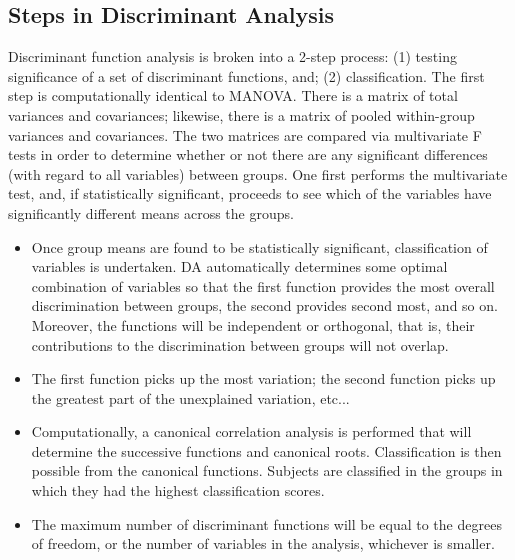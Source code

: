 \subsection{Steps in Discriminant Analysis}
Discriminant function analysis is broken into a 2-step process: (1) testing
significance of a set of discriminant functions, and; (2) classification. The first
step is computationally identical to MANOVA. There is a matrix of total variances
and covariances; likewise, there is a matrix of pooled within-group variances and
covariances. The two matrices are compared via multivariate F tests in order to
determine whether or not there are any significant differences (with regard to all
variables) between groups. One first performs the multivariate test, and, if
statistically significant, proceeds to see which of the variables have significantly
different means across the groups.

\begin{itemize}
\item Once group means are found to be statistically significant, classification of
variables is undertaken. DA automatically determines some optimal combination
of variables so that the first function provides the most overall discrimination
between groups, the second provides second most, and so on. Moreover, the
functions will be independent or orthogonal, that is, their contributions to the
discrimination between groups will not overlap. 
\item The first function picks up the
most variation; the second function picks up the greatest part of the unexplained
variation, etc... 
\item Computationally, a canonical correlation analysis is performed
that will determine the successive functions and canonical roots. Classification is
then possible from the canonical functions. Subjects are classified in the groups
in which they had the highest classification scores. 
\item The maximum number of
discriminant functions will be equal to the degrees of freedom, or the number of
variables in the analysis, whichever is smaller.
\end{itemize}
